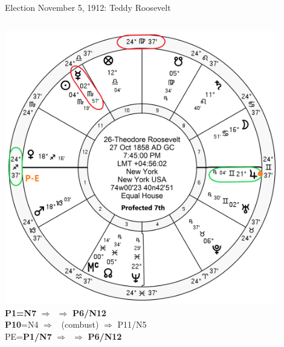\begin{frame}[t]{Election November 5, 1912: Teddy Roosevelt}
\begin{columns}[T, onlytextwidth]
\vspace{-1em}
{\includegraphics[width=0.9\textwidth]{charts/Roosevelt-Prof-7th.png}}
\textbf{\dgreen P1=N7} 
	$\Rightarrow$ \Jupiter\,\Retrograde $\Rightarrow$ \textbf{\dgreen P6/N12}\\
\textbf{\red P10}=N4
	$\Rightarrow$ \Mercury\, (combust) $\Rightarrow$ P11/N5\\
PE=\textbf{\dgreen P1/N7}
	$\Rightarrow$ \Jupiter\,\Retrograde $\Rightarrow$ \textbf{\dgreen P6/N12}


\end{columns}
\end{frame}
